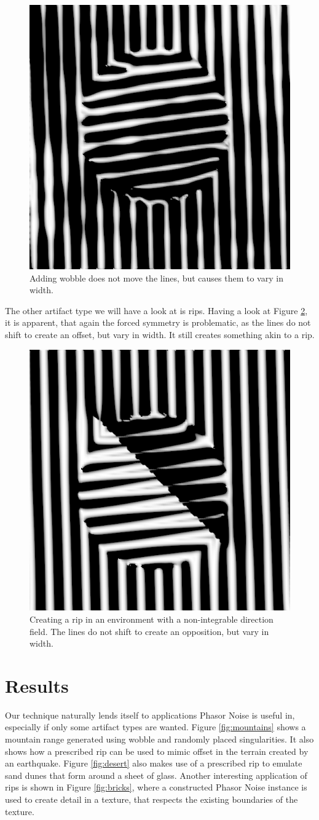 \documentclass{utue} %
\begin{document}
\begin{figure}[ht]
  \centering
  \includegraphics[width=0.49\linewidth]{images/multiDirWobble}
  \caption{Adding wobble does not move the lines, but causes them to vary in width.}\label{fig:multiDirWobble}
\end{figure}

The other artifact type we will have a look at is rips. Having a look at Figure \ref{fig:multiDirRip}, it is apparent, that again the forced symmetry is problematic, as the lines do not shift to create an offset, but vary in width. It still creates something akin to a rip.

\begin{figure}[ht]
  \centering
  \includegraphics[width=0.49\linewidth]{images/multiDirRip}
  \caption{Creating a rip in an environment with a non-integrable direction field. The lines do not shift to create an opposition, but vary in width.}\label{fig:multiDirRip}
\end{figure}

\section{Results}\label{sec:results}
Our technique naturally lends itself to applications Phasor Noise is useful in, especially if only some artifact types are wanted. Figure \ref{fig:mountains} shows a mountain range generated using wobble and randomly placed singularities. It also shows how a prescribed rip can be used to mimic offset in the terrain created by an earthquake. Figure \ref{fig:desert} also makes use of a prescribed rip to emulate sand dunes that form around a sheet of glass. Another interesting application of rips is shown in Figure \ref{fig:bricks}, where a constructed Phasor Noise instance is used to create detail in a texture, that respects the existing boundaries of the texture.
\end{document}
